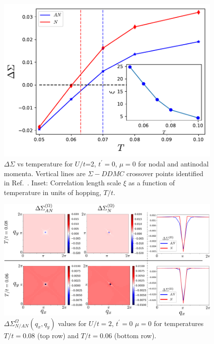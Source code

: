 \documentclass[twocolumn,notitlepage,prb,superscriptaddress,showpacs]{revtex4-1}
\begin{document}
\begin{figure}
\centering
    \includegraphics[width=0.95\linewidth]{deltasigma_cor.pdf}
\caption{\label{fig:lowt} $\Delta \Sigma$ vs temperature for $U/t$=2, $t^\prime=0$, $\mu=0$ for nodal and antinodal momenta.  Vertical lines are $\Sigma - DDMC$ crossover points identified in Ref.~.  Inset: Correlation length scale $\xi$ as a function of temperature in units of hopping, $T/t$. }
\end{figure} 

\begin{figure}
\centering
     \includegraphics[width=\linewidth]{fig8.pdf}
        \caption{ \label{fig:lowt2}$\Delta \Sigma_{N/AN}^{\Omega} (q_x,q_y)$  values for $U/t=2$, $t^{\prime}=0$ $\mu=0$ for temperatures $T/t=0.08$ (top row) and $T/t=0.06$ (bottom row).  
        }
    \end{figure}
    
\end{document}
